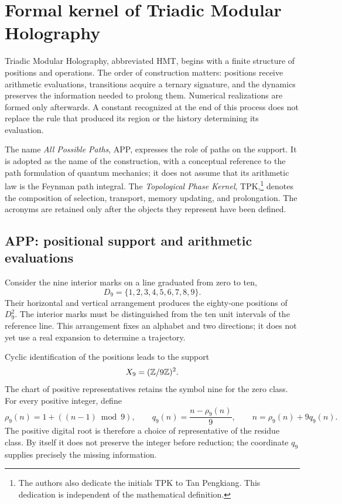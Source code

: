 \section{Formal kernel of Triadic Modular Holography}
\label{sec:nucleo}

Triadic Modular Holography, abbreviated HMT, begins with a finite structure of positions and operations. The order of construction matters: positions receive arithmetic evaluations, transitions acquire a ternary signature, and the dynamics preserves the information needed to prolong them. Numerical realizations are formed only afterwards. A constant recognized at the end of this process does not replace the rule that produced its region or the history determining its evaluation.

The name \emph{All Possible Paths}, APP, expresses the role of paths on the support. It is adopted as the name of the construction, with a conceptual reference to the path formulation of quantum mechanics; it does not assume that its arithmetic law is the Feynman path integral. The \emph{Topological Phase Kernel}, TPK,\footnote{The authors also dedicate the initials TPK to Tan Pengkiang. This dedication is independent of the mathematical definition.} denotes the composition of selection, transport, memory updating, and prolongation. The acronyms are retained only after the objects they represent have been defined.

\subsection{APP: positional support and arithmetic evaluations}

Consider the nine interior marks on a line graduated from zero to ten,
\[
 D_9=\{1,2,3,4,5,6,7,8,9\}.
\]
Their horizontal and vertical arrangement produces the eighty-one positions of \(D_9^2\). The interior marks must be distinguished from the ten unit intervals of the reference line. This arrangement fixes an alphabet and two directions; it does not yet use a real expansion to determine a trajectory.

Cyclic identification of the positions leads to the support
\[
 X_9=(\mathbb Z/9\mathbb Z)^2.
\]
The chart of positive representatives retains the symbol nine for the zero class. For every positive integer, define
\begin{equation}
 \rho_9(n)=1+((n-1)\bmod9),\qquad
 q_9(n)=\frac{n-\rho_9(n)}9,
 \qquad n=\rho_9(n)+9q_9(n).
 \label{eq:residuo-cociente}
\end{equation}
The positive digital root is therefore a choice of representative of the residue class. By itself it does not preserve the integer before reduction; the coordinate \(q_9\) supplies precisely the missing information.

